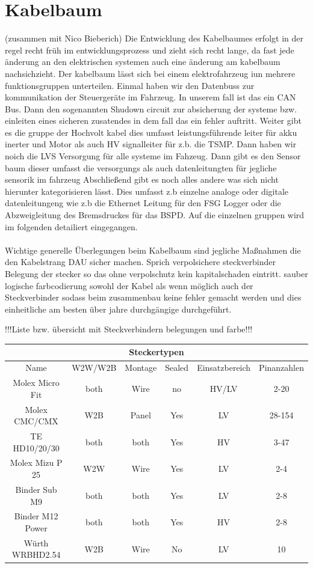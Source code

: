 \section{Kabelbaum} (zusammen mit Nico Bieberich)
Die Entwicklung des Kabelbaumes erfolgt in der regel recht früh im entwicklungsprozess und zieht sich recht lange, da fast jede änderung an den elektrischen systemen auch eine änderung am kabelbaum nachsichzieht. Der kabelbaum lässt sich bei einem elektrofahrzeug iun mehrere funktionsgruppen unterteilen. Einmal haben wir den Datenbuss zur kommunikation der Steuergeräte im Fahrzeug. In unserem fall ist das ein CAN Bus. Dann den sogenannten Shudown circuit zur absicherung der systeme bzw. einleiten eines sicheren zusatendes in dem fall das ein fehler auftritt. Weiter gibt es die gruppe der Hochvolt kabel dies umfasst leistungsführende leiter für akku inerter und Motor als auch HV signalleiter für z.b. die TSMP. Dann haben wir noich die LVS Versorgung für alle systeme im Fahzeug. Dann gibt es den Sensor baum dieser umfasst die versorgungs als auch datenleitungten für jegliche sensorik im fahrzeug  Abschließend gibt es noch alles andere was sich nicht hierunter kategorisieren lässt. Dies umfasst z.b einzelne analoge oder digitale datenleitungeng wie z.b die Ethernet Leitung für den FSG Logger oder die Abzweigleitung des Bremsdruckes für das BSPD. Auf die einzelnen gruppen wird im folgenden detailiert eingegangen.\\
\\
Wichtige generelle Überlegungen beim Kabelbaum sind jegliche Maßnahmen die den Kabelstrang DAU sicher machen. Sprich verpolsichere steckverbinder Belegung der stecker so das ohne verpolschutz kein kapitalschaden eintritt. sauber logische farbcodierung sowohl der Kabel als wenn möglich auch der Steckverbinder sodass beim zusammenbau keine fehler gemacht werden und dies einheitliche am besten über jahre durchgängige durchgeführt.

!!!Liste bzw. übersicht mit Steckverbindern belegungen und farbe!!!

\begin{tabular}{|c|c|c|c|c|c|}
	\hline
	\multicolumn{6}{|c|}{Steckertypen} \\
	\hline
	Name & W2W/W2B & Montage & Sealed & Einsatzbereich & Pinanzahlen \\
	\hline
	Molex Micro Fit & both & Wire & no & HV/LV & 2-20 \\
	\hline
	Molex CMC/CMX & W2B & Panel & Yes & LV  & 28-154 \\
	\hline
	TE HD10/20/30 & both & both & Yes & HV & 3-47 \\
	\hline
	Molex Mizu P 25 & W2W & Wire & Yes & LV & 2-4 \\
	\hline
	Binder Sub M9 & both & both & Yes & LV & 2-8 \\
	\hline
	Binder M12 Power & both & both & Yes & HV & 2-8 \\
	\hline
	Würth WRBHD2.54 & W2B & Wire & No & LV & 10 \\
	\hline
\end{tabular}

